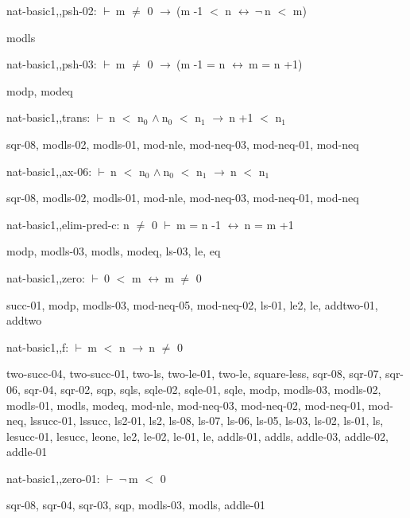 \documentclass[a4paper]{article}
\newcommand{\Fol}{\mbox{$\vdash\ $}}
\newcommand{\Not}{\mbox{$\neg\ $}}
\newcommand{\And}{\mbox{$\wedge\ $}}
\newcommand{\Imp}{\mbox{$\rightarrow\ $}}
\newcommand{\Equiv}{\mbox{$\leftrightarrow\ $}}
\begin{document}
nat-basic1,,psh-02: 
 \Fol m $\neq$ 0 \Imp (m -1 $<$ n \Equiv \Not n $<$ m)



modls

\bigskip

nat-basic1,,psh-03: 
 \Fol m $\neq$ 0 \Imp (m -1 = n \Equiv m = n +1)



modp, modeq

\bigskip

nat-basic1,,trans: 
 \Fol n $<$ $\mbox{n}_{0}$ \And $\mbox{n}_{0}$ $<$ $\mbox{n}_{1}$ \Imp n +1 $<$ $\mbox{n}_{1}$



sqr-08, modls-02, modls-01, mod-nle, mod-neq-03, mod-neq-01, mod-neq

\bigskip

nat-basic1,,ax-06: 
 \Fol n $<$ $\mbox{n}_{0}$ \And $\mbox{n}_{0}$ $<$ $\mbox{n}_{1}$ \Imp n $<$ $\mbox{n}_{1}$



sqr-08, modls-02, modls-01, mod-nle, mod-neq-03, mod-neq-01, mod-neq

\bigskip

nat-basic1,,elim-pred-c: 
n $\neq$ 0
 \Fol m = n -1 \Equiv n = m +1



modp, modls-03, modls, modeq, ls-03, le, eq

\bigskip

nat-basic1,,zero: 
 \Fol 0 $<$ m \Equiv m $\neq$ 0



succ-01, modp, modls-03, mod-neq-05, mod-neq-02, ls-01, le2, le, addtwo-01, addtwo

\bigskip

nat-basic1,,f: 
 \Fol m $<$ n \Imp n $\neq$ 0



two-succ-04, two-succ-01, two-ls, two-le-01, two-le, square-less, sqr-08, sqr-07, sqr-06, sqr-04, sqr-02, sqp, sqls, sqle-02, sqle-01, sqle, modp, modls-03, modls-02, modls-01, modls, modeq, mod-nle, mod-neq-03, mod-neq-02, mod-neq-01, mod-neq, lssucc-01, lssucc, ls2-01, ls2, ls-08, ls-07, ls-06, ls-05, ls-03, ls-02, ls-01, ls, lesucc-01, lesucc, leone, le2, le-02, le-01, le, addls-01, addls, addle-03, addle-02, addle-01

\bigskip

nat-basic1,,zero-01: 
 \Fol \Not m $<$ 0



sqr-08, sqr-04, sqr-03, sqp, modls-03, modls, addle-01
\end{document}
